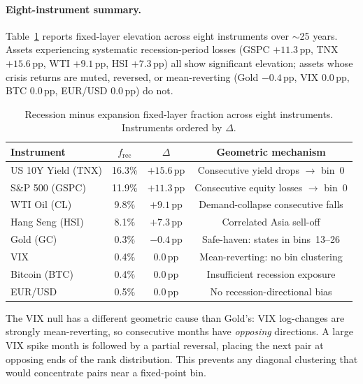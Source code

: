\paragraph{Eight-instrument summary.}
Table~\ref{tab:multi-instrument} reports fixed-layer elevation across
eight instruments over $\sim$25 years.  Assets experiencing systematic
recession-period losses (GSPC $+11.3$\,pp, TNX $+15.6$\,pp, WTI
$+9.1$\,pp, HSI $+7.3$\,pp) all show significant elevation; assets
whose crisis returns are muted, reversed, or mean-reverting (Gold
$-0.4$\,pp, VIX $0.0$\,pp, BTC $0.0$\,pp, EUR/USD $0.0$\,pp) do not.

\begin{table}[h]
\centering
\caption{Recession minus expansion fixed-layer fraction across eight
  instruments.  Instruments ordered by $\Delta$.}
\label{tab:multi-instrument}
\begin{tabular}{lccc}
\toprule
Instrument & $f_\mathrm{rec}$ & $\Delta$ & Geometric mechanism \\
\midrule
US 10Y Yield (TNX)  & 16.3\% & $+15.6$\,pp & Consecutive yield drops $\to$ bin~0 \\
S\&P 500 (GSPC)     & 11.9\% & $+11.3$\,pp & Consecutive equity losses $\to$ bin~0 \\
WTI Oil (CL)        &  9.8\% & $+9.1$\,pp  & Demand-collapse consecutive falls \\
Hang Seng (HSI)     &  8.1\% & $+7.3$\,pp  & Correlated Asia sell-off \\
\midrule
Gold (GC)           &  0.3\% & $-0.4$\,pp  & Safe-haven: states in bins~13--26 \\
VIX                 &  0.4\% & $0.0$\,pp   & Mean-reverting: no bin clustering \\
Bitcoin (BTC)       &  0.4\% & $0.0$\,pp   & Insufficient recession exposure \\
EUR/USD             &  0.5\% & $0.0$\,pp   & No recession-directional bias \\
\bottomrule
\end{tabular}
\end{table}

The VIX null has a different geometric cause than Gold's: VIX log-changes
are strongly mean-reverting, so consecutive months have \emph{opposing}
directions.  A large VIX spike month is followed by a partial reversal,
placing the next pair at opposing ends of the rank distribution.  This
prevents any diagonal clustering that would concentrate pairs near a
fixed-point bin.

